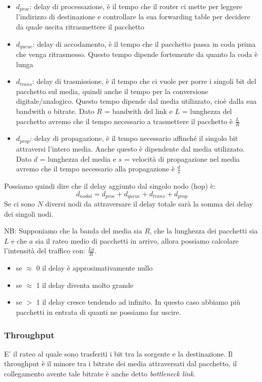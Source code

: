 \begin{itemize}
    \item $d_{proc}$: delay di processazione, è il tempo che il router ci mette per leggere l'indirizzo di destinazione e controllare la sua forwarding table per decidere da quale uscita ritrasmettere il pacchetto
    \item $d_{queue}$: delay di accodamento, è il tempo che il pacchetto passa in coda prima che venga ritrasmesso. Questo tempo dipende fortemente da quanto la coda è lunga
    \item $d_{trans}$: delay di trasmissione, è il tempo che ci vuole per porre i singoli bit del pacchetto sul media, quindi anche il tempo per la conversione digitale/analogico. Questo tempo dipende dal media utilizzato, cioè dalla sua bandwith o bitrate.
    Dato $R$ = bandwith del link e $L$ = lunghezza del pacchetto avremo che il tempo necessario a trasmettere il pacchetto è $\frac{L}{R}$
    \item $d_{prop}$: delay di propagazione, è il tempo necessario affinché il singolo bit attraversi l'intero media. Anche questo è dipendente dal media utilizzato.
    Dato $d$ = lunghezza del media e $s$ = velocità di propagazione nel media avremo che il tempo necessario alla propagazione è $\frac{d}{s}$
\end{itemize}

Possiamo quindi dire che il delay aggiunto dal singolo nodo (hop) è:
$$ d_{nodal} = d_{proc} + d_{queue} + d_{trans} + d_{prop} $$
Se ci sono $N$ diversi nodi da attraversare il delay totale sarà la somma dei delay dei singoli nodi.

NB: Supponiamo che la banda del media sia $R$, che la lunghezza dei pacchetti sia $L$ e che $a$ sia il rateo medio di pacchetti in arrivo, allora possiamo calcolare l'intensità del traffico con: $\frac{La}{R}$.
\begin{itemize}
    \item se $\approx$ 0 il delay è approsimativamente nullo
    \item se $\approx$ 1 il delay diventa molto grande
    \item se $>$ 1 il delay cresce tendendo ad infinito. In questo caso abbiamo più pacchetti in entrata di quanti ne possiamo far uscire.
\end{itemize}

\subsubsection{Throughput}
E' il rateo al quale sono trasferiti i bit tra la sorgente e la destinazione.
Il throughput è il minore tra i bitrate dei media attraversati dal pacchetto, il collegamento avente tale bitrate è anche detto \emph{bottleneck link}.

